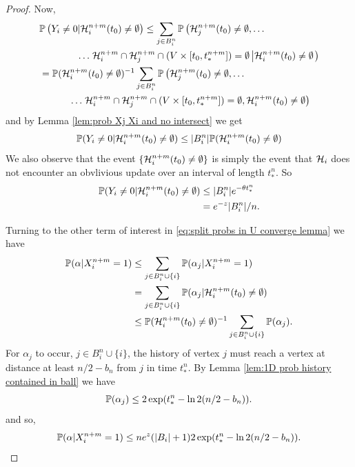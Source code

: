 \begin{proof}
		Now,
		\begin{align}
			&\mathbb{P}\left(Y_i \neq 0 | \mathcal{H}_i^{n+m}(t_0) \neq \emptyset \right) \leq \sum_{j \in B_i^n} \mathbb{P}\left(\mathcal{H}_j^{n+m}(t_0) \neq \emptyset, \dots \right. \notag \\
			&\phantom{=====} \dots \left. \mathcal{H}_i^{n+m} \cap \mathcal{H}_j^{n+m} \cap (V \times [t_0, t_*^{n+m}]) = \emptyset \left| \mathcal{H}_i^{n+m}(t_0) \neq \emptyset \right.\right)\\
			&= \mathbb{P}(\mathcal{H}_i^{n+m}(t_0) \neq \emptyset)^{-1} \sum_{j \in B_i^n} \mathbb{P}\left(\mathcal{H}_j^{n+m}(t_0) \neq \emptyset, \dots \right. \notag \\
			&\phantom{====}\dots \left. \mathcal{H}_i^{n+m} \cap \mathcal{H}_j^{n+m} \cap (V \times [t_0, t_*^{n+m}]) = \emptyset, \mathcal{H}_i^{n+m}(t_0) \neq \emptyset \right)
		\end{align}
		and by Lemma \ref{lem:prob Xj Xi and no intersect} we get
		\begin{equation}
			\mathbb{P}(Y_i \neq 0 | \mathcal{H}_i^{n+m}(t_0) \neq \emptyset) \leq |B_i^n| \mathbb{P}(\mathcal{H}_i^{n+m}(t_0) \neq \emptyset)
		\end{equation}
		We also observe that the event $\{\mathcal{H}_i^{n+m}(t_0) \neq \emptyset\}$ is simply the event that $\mathcal{H}_i$ does not encounter an obvlivious update over an interval of length $t_*^n$. So
		\begin{align}
			\mathbb{P}(Y_i \neq 0 | \mathcal{H}_i^{n+m}(t_0) \neq \emptyset) &\leq |B_i^n| e^{-\theta t_*^n}\\
			&= e^{-z} |B_i^n| / n.
		\end{align}

		Turning to the other term of interest in \eqref{eq:split probs in U converge lemma} we have
		\begin{align}
			\mathbb{P}(\alpha | X_i^{n+m} = 1) &\leq \sum_{j \in B_i^n \cup \{i\}} \mathbb{P}(\alpha_j|X_i^{n+m} = 1) \\
			&= \sum_{j \in B_i^n \cup \{i\}} \mathbb{P}(\alpha_j|\mathcal{H}_i^{n+m}(t_0) \neq \emptyset) \\
			&\leq \mathbb{P}(\mathcal{H}_i^{n+m}(t_0) \neq \emptyset)^{-1} \sum_{j \in B_i^n \cup \{i\}} \mathbb{P}(\alpha_j).
		\end{align}
		For $\alpha_j$ to occur, $j \in B_i^n \cup \{i\}$, the history of vertex $j$ must reach a vertex at distance at least $n/2 - b_n$ from $j$ in time $t_*^n$. By Lemma \ref{lem:1D prob history contained in ball} we have
		\begin{equation}
			\mathbb{P}(\alpha_j) \leq 2\exp(t_*^n - \ln 2 (n/2 - b_n)).
		\end{equation}
		and so,
		\begin{equation}
			\mathbb{P}(\alpha | X_i^{n+m} = 1) \leq n e^{z} (|B_i| + 1) 2\exp(t_*^n - \ln 2 (n/2 - b_n)).
		\end{equation}


\end{proof}
